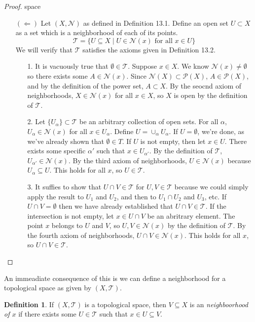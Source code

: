\documentclass{article}
\newcommand{\T}{\mathcal{T}}
\theoremstyle{definition}
\newtheorem{definition}{Definition}[section]
\begin{document}
\begin{proof}{\color{white}space}
\begin{enumerate}
			\item [$ (\Longleftarrow) $] Let $(X,\mathcal N)$ as defined in Definition 13.1. Define an open set $U \subset X$ as a set which is a neighborhood of each of its points.
			$$\mathcal T=\{U\subseteq X\mid U\in \mathcal N(x)\text{ for all }x\in U\}$$ We will verify that $\mathcal T$ satisfies the axioms given in Definition 13.2.
			\begin{enumerate}
				\item[1.] It is vacuously true that $\emptyset \in \T$. Suppose $x\in X$. We know $\mathcal N(x)\neq\emptyset$ so there exists some $A\in \mathcal N(x) $. Since $\mathcal N(X)\subset \mathcal P(X)$, $A\in \mathcal P(X)$, and by the definition of the power set, $A\subset X$. By the seocnd axiom of neighborhoods, $X\in \mathcal N(x)$ for all $x\in X$, so $X$ is open by the definition of $\mathcal T$.
				\item[2.] Let $\{U_\alpha\}\subset \T$ be an arbitrary collection of open sets. For all $\alpha$, $U_\alpha \in \mathcal N(x)$ for all $x\in U_\alpha$. Define $U = \cup_\alpha U_\alpha$. If $U=\emptyset$, we're done, as we've already shown that $\emptyset \in T$. If $U$ is not empty, then let $x\in U$. There exists some specific $\alpha'$ such that $x\in U_{\alpha'}$. By the definition of $\mathcal T$, $U_{\alpha'}\in \mathcal N(x)$. By the third axiom of neighborhoods, $U\in \mathcal N(x)$ because $U_\alpha\subseteq U$. This holds for all $x$, so $U\in \T$.  
				\item[3.] It suffies to show that $U\cap V\in\mathcal T$ for $U,V\in\T$ because we could simply apply the result to $U_1$ and $U_2$, and then to $U_1\cap U_2$ and $U_3$, etc. If $U\cap V=\emptyset$ then we have already established that $U\cap V\in \T$. If the intersection is not empty, let $x\in U\cap V$ be an abritrary element. The point $x$ belongs to $U$ and $V$, so $U,V\in\mathcal N(x)$ by the definition of $\mathcal T$. By the fourth axiom of neighborhoods, $U\cap V\in\mathcal N(x)$. This holds for all $x$, so $U\cap V\in\mathcal T$.
			\end{enumerate}
		\end{enumerate}
	\end{proof}
	
	An immeadiate consequence of this is we can define a neighborhood for a topological space as given by $(X,\T)$.
	
	\begin{definition}\label{def13.3}
		If $(X,\T)$ is a topological space, then $V\subseteq X$ is an \textit{\color{red}neighboorhood of $x$} if there exists some $U\in \T$ such that $x\in U\subseteq V$.
	\end{definition}
	
\end{document}
